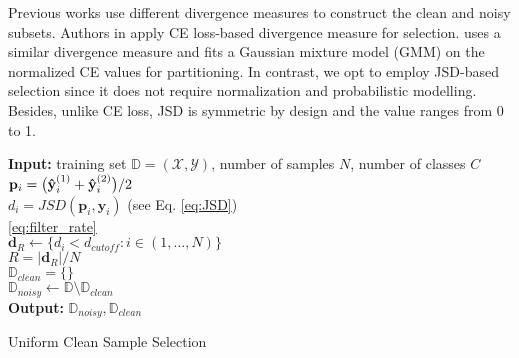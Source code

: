 \documentclass[10pt,twocolumn,letterpaper]{article}
\begin{document}
Previous works use different divergence measures to construct the clean and noisy subsets. Authors in \cite{han2018co, li2020dividemix} apply CE loss-based divergence measure for selection. \cite{li2020dividemix} uses a similar divergence measure and fits a Gaussian mixture model (GMM) on the normalized CE values for partitioning. In contrast, we opt to employ JSD-based selection since it does not require normalization and probabilistic modelling. Besides, unlike CE loss, JSD is symmetric by design and the value ranges from 0 to 1. 


\begin{algorithm}[htb]
	
	\DontPrintSemicolon
	\small
	\textbf{Input:} training set $\mathbb{D} = (\mathcal{X},\mathcal{Y})$, number of samples $N$, number of classes $C$ \\
	    {
    	    $\mathbf{\mathbf{p}}_i = \big(\mathbf{\Hat{y}}^{(1)}_i+\mathbf{\Hat{y}}^{(2)}_i\big)/2$ \\
$d_i = JSD(\mathbf{p}_i,\mathbf{y}_i)$ (see Eq. \eqref{eq:JSD}) \\
	    }
	    \eqref{eq:filter_rate} \\
	   $\mathbf{d}_{R} \leftarrow  \{d_i < d_{cutoff}: i \in (1, \dots , N)\} $ \\
	    $R = |\mathbf{d}_{R}|/N $ \\ 
	   $\mathbb{D}_{clean} = \{ \}$ \\
	    $\mathbb{D}_{noisy} \leftarrow  \mathbb{D} \setminus \mathbb{D}_{clean}$ \\
		
\textbf{Output:} $\mathbb{D}_{noisy}, \mathbb{D}_{clean}$
	\caption{\small Uniform Clean Sample Selection}
	\label{alg:UniCon}
\end{algorithm}
\end{document}
